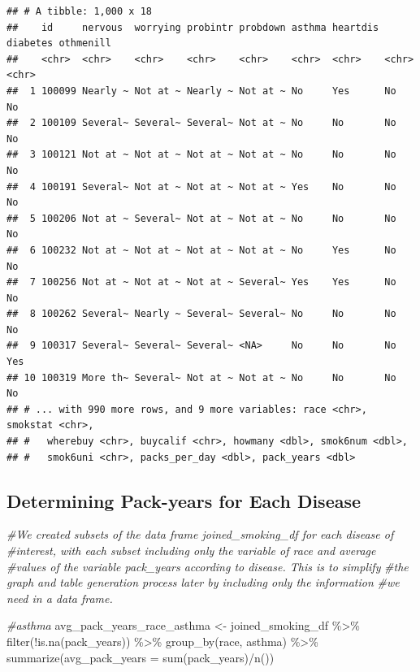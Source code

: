 \documentclass[
]{article}
\newenvironment{Shaded}{\begin{snugshade}}{\end{snugshade}}
\newcommand{\AttributeTok}[1]{\textcolor[rgb]{0.77,0.63,0.00}{#1}}
\newcommand{\CommentTok}[1]{\textcolor[rgb]{0.56,0.35,0.01}{\textit{#1}}}
\newcommand{\FunctionTok}[1]{\textcolor[rgb]{0.00,0.00,0.00}{#1}}
\newcommand{\NormalTok}[1]{#1}
\newcommand{\OtherTok}[1]{\textcolor[rgb]{0.56,0.35,0.01}{#1}}
\newcommand{\SpecialCharTok}[1]{\textcolor[rgb]{0.00,0.00,0.00}{#1}}
\begin{document}
\begin{verbatim}
## # A tibble: 1,000 x 18
##    id     nervous  worrying probintr probdown asthma heartdis diabetes othmenill
##    <chr>  <chr>    <chr>    <chr>    <chr>    <chr>  <chr>    <chr>    <chr>    
##  1 100099 Nearly ~ Not at ~ Nearly ~ Not at ~ No     Yes      No       No       
##  2 100109 Several~ Several~ Several~ Not at ~ No     No       No       No       
##  3 100121 Not at ~ Not at ~ Not at ~ Not at ~ No     No       No       No       
##  4 100191 Several~ Not at ~ Not at ~ Not at ~ Yes    No       No       No       
##  5 100206 Not at ~ Several~ Not at ~ Not at ~ No     No       No       No       
##  6 100232 Not at ~ Not at ~ Not at ~ Not at ~ No     Yes      No       No       
##  7 100256 Not at ~ Not at ~ Not at ~ Several~ Yes    Yes      No       No       
##  8 100262 Several~ Nearly ~ Several~ Several~ No     No       No       No       
##  9 100317 Several~ Several~ Several~ <NA>     No     No       No       Yes      
## 10 100319 More th~ Several~ Not at ~ Not at ~ No     No       No       No       
## # ... with 990 more rows, and 9 more variables: race <chr>, smokstat <chr>,
## #   wherebuy <chr>, buycalif <chr>, howmany <dbl>, smok6num <dbl>,
## #   smok6uni <chr>, packs_per_day <dbl>, pack_years <dbl>
\end{verbatim}

\newpage

\hypertarget{determining-pack-years-for-each-disease}{%
\subsection{Determining Pack-years for Each
Disease}\label{determining-pack-years-for-each-disease}}

\begin{Shaded}
\begin{Highlighting}[]
\CommentTok{\#We created subsets of the data frame joined\_smoking\_df for each disease of}
\CommentTok{\#interest, with each subset including only the variable of \textasciigrave{}race\textasciigrave{} and average}
\CommentTok{\#values of the variable \textasciigrave{}pack\_years\textasciigrave{} according to disease. This is to simplify}
\CommentTok{\#the graph and table generation process later by including only the information}
\CommentTok{\#we need in a data frame.}

\CommentTok{\#asthma}
\NormalTok{avg\_pack\_years\_race\_asthma }\OtherTok{\textless{}{-}}\NormalTok{ joined\_smoking\_df }\SpecialCharTok{\%\textgreater{}\%}
  \FunctionTok{filter}\NormalTok{(}\SpecialCharTok{!}\FunctionTok{is.na}\NormalTok{(pack\_years)) }\SpecialCharTok{\%\textgreater{}\%}
  \FunctionTok{group\_by}\NormalTok{(race, asthma) }\SpecialCharTok{\%\textgreater{}\%}
  \FunctionTok{summarize}\NormalTok{(}\AttributeTok{avg\_pack\_years =} \FunctionTok{sum}\NormalTok{(pack\_years)}\SpecialCharTok{/}\FunctionTok{n}\NormalTok{())}
\end{Highlighting}
\end{Shaded}
\end{document}

